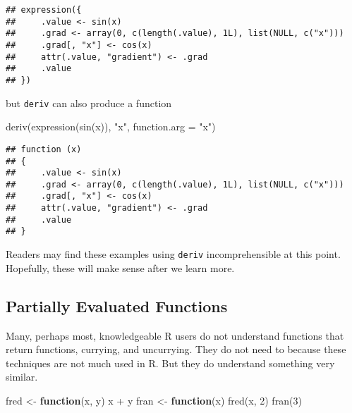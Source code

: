 \documentclass[
]{article}
\newenvironment{Shaded}{\begin{snugshade}}{\end{snugshade}}
\newcommand{\AttributeTok}[1]{\textcolor[rgb]{0.77,0.63,0.00}{#1}}
\newcommand{\ControlFlowTok}[1]{\textcolor[rgb]{0.13,0.29,0.53}{\textbf{#1}}}
\newcommand{\DecValTok}[1]{\textcolor[rgb]{0.00,0.00,0.81}{#1}}
\newcommand{\FunctionTok}[1]{\textcolor[rgb]{0.00,0.00,0.00}{#1}}
\newcommand{\NormalTok}[1]{#1}
\newcommand{\OtherTok}[1]{\textcolor[rgb]{0.56,0.35,0.01}{#1}}
\newcommand{\SpecialCharTok}[1]{\textcolor[rgb]{0.00,0.00,0.00}{#1}}
\newcommand{\StringTok}[1]{\textcolor[rgb]{0.31,0.60,0.02}{#1}}
\begin{document}
\begin{verbatim}
## expression({
##     .value <- sin(x)
##     .grad <- array(0, c(length(.value), 1L), list(NULL, c("x")))
##     .grad[, "x"] <- cos(x)
##     attr(.value, "gradient") <- .grad
##     .value
## })
\end{verbatim}

but \texttt{deriv} can also produce a function

\begin{Shaded}
\begin{Highlighting}[]
\FunctionTok{deriv}\NormalTok{(}\FunctionTok{expression}\NormalTok{(}\FunctionTok{sin}\NormalTok{(x)), }\StringTok{"x"}\NormalTok{, }\AttributeTok{function.arg =} \StringTok{"x"}\NormalTok{)}
\end{Highlighting}
\end{Shaded}

\begin{verbatim}
## function (x) 
## {
##     .value <- sin(x)
##     .grad <- array(0, c(length(.value), 1L), list(NULL, c("x")))
##     .grad[, "x"] <- cos(x)
##     attr(.value, "gradient") <- .grad
##     .value
## }
\end{verbatim}

Readers may find these examples using \texttt{deriv} incomprehensible at
this point. Hopefully, these will make sense after we learn more.

\hypertarget{partially-evaluated-functions}{%
\subsection{Partially Evaluated
Functions}\label{partially-evaluated-functions}}

Many, perhaps most, knowledgeable R users do not understand functions
that return functions, currying, and uncurrying. They do not need to
because these techniques are not much used in R. But they do understand
something very similar.

\begin{Shaded}
\begin{Highlighting}[]
\NormalTok{fred }\OtherTok{\textless{}{-}} \ControlFlowTok{function}\NormalTok{(x, y) x }\SpecialCharTok{+}\NormalTok{ y}
\NormalTok{fran }\OtherTok{\textless{}{-}} \ControlFlowTok{function}\NormalTok{(x) }\FunctionTok{fred}\NormalTok{(x, }\DecValTok{2}\NormalTok{)}
\FunctionTok{fran}\NormalTok{(}\DecValTok{3}\NormalTok{)}
\end{Highlighting}
\end{Shaded}
\end{document}
